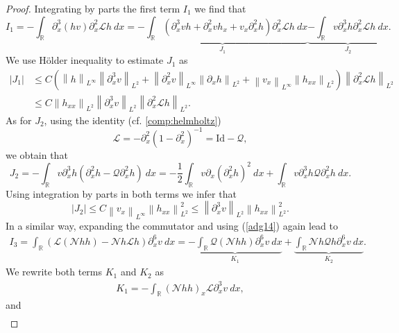 \documentclass[final,11pt,a4paper,reqno]{amsart}
\newcommand{\norm}[1]{\left\| #1 \right\|}
\newcommand{\RR}{\mathbb R}
\newcommand{\pa}{\partial}
\theoremstyle{definition}
\begin{document}
\begin{proof}
Integrating by parts the first term $I_{1}$ we find that
\begin{equation*}
I_{1}=-\int_{\RR}\pa_{x}^{3}(hv)\pa_{x}^{2}\mathscr{L}h \ dx =\underbrace{-\int_{\RR}\left( \pa_{x}^{3}v h+ \pa_{x}^{2}vh_{x}+v_{x}\pa_{x}^{2}h \right)\pa_{x}^{2}\mathscr{L}h \ dx}_{J_{1}}\underbrace{-\int_{\RR}v\pa_{x}^{3}h \pa_{x}^{2}\mathscr{L}h \ dx}_{J_{2}} .
\end{equation*}
We use H\"older inequality to estimate $J_{1}$ as
\begin{align}\label{est:J1}
|J_{1}|&\leq C \left( \norm{h}_{L^{\infty}}\norm{\pa_{x}^{3}v}_{L^{2}}+\norm{\pa_{x}^{2}v}_{L^{\infty}}\norm{\pa_{x}h}_{L^{2}}+\norm{v_{x}}_{L^{\infty}}\norm{h_{xx}}_{L^{2}}\right)\norm{\pa_{x}^{2}\mathscr{L}h}_{L^{2}} \nonumber \\
& \leq C \norm{h_{xx}}_{L^{2}}\norm{\pa_{x}^{3}v}_{L^{2}}\norm{\pa_{x}^{2}\mathscr{L}h}_{L^{2}}.
\end{align}
As for $J_{2}$, using the identity (cf. \eqref{comp:helmholtz})
\begin{equation}\label{adg14}
\mathscr{L}=-\partial_{x}^2 (1-\pa_{x}^{2})^{-1}= \mathrm{Id}-\mathscr{Q},
\end{equation}
we obtain that
\begin{equation*}\label{rewrite:J2}
J_{2}=-\int_{\RR}v \pa_{x}^{3}h \left(\pa_{x}^{2}h-\mathscr{Q}\pa_{x}^{2}h\right) \ dx =- \frac{1}{2}\int_{\RR}v \pa_{x}(\pa_{x}^{2}h)^{2} \ dx + \int_{\RR}v \pa_{x}^{3}h \mathscr{Q}\pa_{x}^{2}h \ dx.
\end{equation*}
Using integration by parts in both terms we infer that
\begin{equation}\label{est:J2}
|J_{2}|\leq C \norm{v_{x}}_{L^{\infty}} \norm{h_{xx}}^{2}_{L^{2}}\leq \norm{\pa_{x}^{3}v}_{L^{2}} \norm{h_{xx}}^{2}_{L^{2}}.
\end{equation}
In a similar way, expanding the commutator and using (\ref{adg14}) again lead to
\begin{align*}
I_{3}=\int_{\RR} \left( \mathscr{L}(\mathscr{N}h h)-\mathscr{N}h\mathscr{L}h\right)\pa_{x}^{6}v \  dx=\underbrace{- \int_{\RR} \mathscr{Q}(\mathscr{N}h h)\pa_{x}^{6}v \  dx}_{K_{1}} +\underbrace{ \int_{\RR} \mathscr{N}h  \mathscr{Q}h \pa_{x}^{6}v \  dx}_{K_{2}}.
\end{align*}
We rewrite both terms $K_{1}$ and $K_{2}$ as
\begin{align*}
K_{1}= -\int_{\RR} (\mathscr{N}hh)_{x} \mathscr{L}\pa_{x}^{3}v \  dx,
\end{align*}
and
\begin{align*}

\end{align*}
\end{proof}
\end{document}
